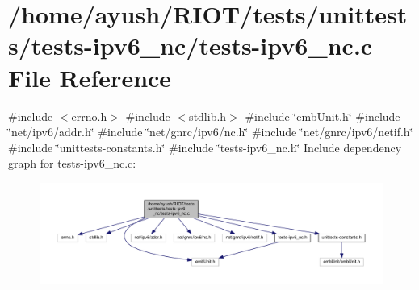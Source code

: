 \hypertarget{tests-ipv6__nc_8c}{}\section{/home/ayush/\+R\+I\+O\+T/tests/unittests/tests-\/ipv6\+\_\+nc/tests-\/ipv6\+\_\+nc.c File Reference}
\label{tests-ipv6__nc_8c}
{\ttfamily \#include $<$errno.\+h$>$}\newline
{\ttfamily \#include $<$stdlib.\+h$>$}\newline
{\ttfamily \#include \char`\"{}emb\+Unit.\+h\char`\"{}}\newline
{\ttfamily \#include \char`\"{}net/ipv6/addr.\+h\char`\"{}}\newline
{\ttfamily \#include \char`\"{}net/gnrc/ipv6/nc.\+h\char`\"{}}\newline
{\ttfamily \#include \char`\"{}net/gnrc/ipv6/netif.\+h\char`\"{}}\newline
{\ttfamily \#include \char`\"{}unittests-\/constants.\+h\char`\"{}}\newline
{\ttfamily \#include \char`\"{}tests-\/ipv6\+\_\+nc.\+h\char`\"{}}\newline
Include dependency graph for tests-\/ipv6\+\_\+nc.c\+:
\nopagebreak
\begin{figure}[H]
\begin{center}
\leavevmode
\includegraphics[width=350pt]{tests-ipv6__nc_8c__incl}
\end{center}
\end{figure}
